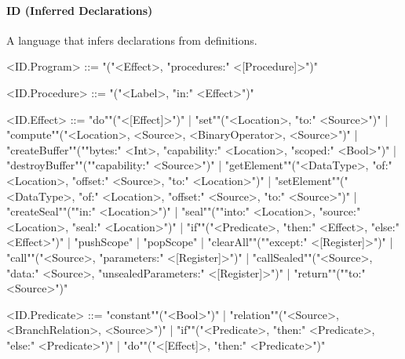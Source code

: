 \documentclass[main.tex]{subfiles}
\begin{document}
\paragraph{ ID (Inferred Declarations) } A language that infers declarations from definitions.
\begin{grammar}
	\footnotesize
				<ID.Program> ::=
							"("<Effect>, "procedures:" <[Procedure]>")"
				\par
				<ID.Procedure> ::=
							"("<Label>, "in:" <Effect>")"
				\par
				<ID.Effect> ::=
						"do""("<[Effect]>")"
						| "set""("<Location>, "to:" <Source>")"
						| "compute""("<Location>, <Source>, <BinaryOperator>, <Source>")"
						| "createBuffer""(""bytes:" <Int>, "capability:" <Location>, "scoped:" <Bool>")"
						| "destroyBuffer""(""capability:" <Source>")"
						| "getElement""("<DataType>, "of:" <Location>, "offset:" <Source>, "to:" <Location>")"
						| "setElement""("<DataType>, "of:" <Location>, "offset:" <Source>, "to:" <Source>")"
						| "createSeal""(""in:" <Location>")"
						| "seal""(""into:" <Location>, "source:" <Location>, "seal:" <Location>")"
						| "if""("<Predicate>, "then:" <Effect>, "else:" <Effect>")"
						| "pushScope"
						| "popScope"
						| "clearAll""(""except:" <[Register]>")"
						| "call""("<Source>, "parameters:" <[Register]>")"
						| "callSealed""("<Source>, "data:" <Source>, "unsealedParameters:" <[Register]>")"
						| "return""(""to:" <Source>")"
				\par
				<ID.Predicate> ::=
						"constant""("<Bool>")"
						| "relation""("<Source>, <BranchRelation>, <Source>")"
						| "if""("<Predicate>, "then:" <Predicate>, "else:" <Predicate>")"
						| "do""("<[Effect]>, "then:" <Predicate>")"
				\par
\end{grammar}
\par
\end{document}
